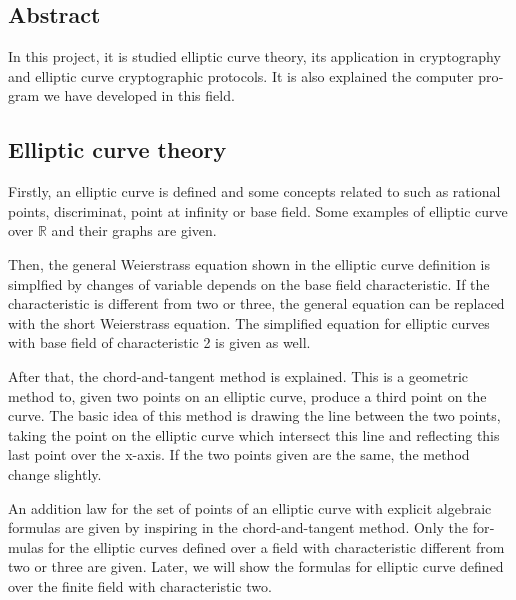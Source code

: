 \begingroup
\let\clearpage\relax
\let\cleardoublepage\relax
\let\cleardoublepage\relax

\begin{otherlanguage}{american}

\chapter*{Abstract}


In this project, it is studied elliptic curve theory, its application in cryptography and elliptic curve cryptographic protocols. It is also explained the computer program we have developed in this field.

\section*{Elliptic curve theory}

Firstly, an elliptic curve is defined and some concepts related to such as rational points, discriminat, point at infinity or base field. Some examples of elliptic curve over $\mathbb{R}$ and their graphs are given.

Then, the general Weierstrass equation shown in the elliptic curve definition is simplfied by changes of variable depends on the base field characteristic. If the characteristic is different from two or three, the general equation can be replaced with the short Weierstrass equation. The simplified equation for elliptic curves with base field of characteristic 2 is given as well.

After that, the chord-and-tangent method is explained. This is a geometric method to, given two points on an elliptic curve, produce a third point on the curve. The basic idea of this method is drawing the line between the two points, taking the point on the elliptic curve which intersect this line and reflecting this last point over the x-axis. If the two points given are the same, the method change slightly.

An addition law for the set of points of an elliptic curve with explicit algebraic formulas are given by inspiring in the chord-and-tangent method. Only the formulas for the elliptic curves defined over a field with characteristic different from two or three are given. Later, we will show the formulas for elliptic curve defined over the finite field with characteristic two.


\end{otherlanguage}
